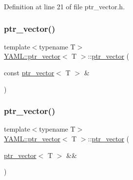Definition at line 21 of file ptr\+\_\+vector.\+h.

\mbox{\label{class_y_a_m_l_1_1ptr__vector_a2249c8dd5ba06a7e26e8d25340e215b2}} 
\subsubsection{\texorpdfstring{ptr\_vector()}{ptr\_vector()}\hspace{0.1cm}{\footnotesize\ttfamily [2/3]}}
{\footnotesize\ttfamily template$<$typename T$>$ \\
\mbox{\hyperlink{class_y_a_m_l_1_1ptr__vector}{Y\+A\+M\+L\+::ptr\+\_\+vector}}$<$ T $>$\+::\mbox{\hyperlink{class_y_a_m_l_1_1ptr__vector}{ptr\+\_\+vector}} (\begin{DoxyParamCaption}\item[{const \mbox{\hyperlink{class_y_a_m_l_1_1ptr__vector}{ptr\+\_\+vector}}$<$ T $>$ \&}]{ }\end{DoxyParamCaption})\hspace{0.3cm}{\ttfamily [delete]}}

\mbox{\label{class_y_a_m_l_1_1ptr__vector_a3fc1364eda0a9b01752ef570c12bf326}} 
\subsubsection{\texorpdfstring{ptr\_vector()}{ptr\_vector()}\hspace{0.1cm}{\footnotesize\ttfamily [3/3]}}
{\footnotesize\ttfamily template$<$typename T$>$ \\
\mbox{\hyperlink{class_y_a_m_l_1_1ptr__vector}{Y\+A\+M\+L\+::ptr\+\_\+vector}}$<$ T $>$\+::\mbox{\hyperlink{class_y_a_m_l_1_1ptr__vector}{ptr\+\_\+vector}} (\begin{DoxyParamCaption}\item[{\mbox{\hyperlink{class_y_a_m_l_1_1ptr__vector}{ptr\+\_\+vector}}$<$ T $>$ \&\&}]{ }\end{DoxyParamCaption})\hspace{0.3cm}{\ttfamily [default]}}



